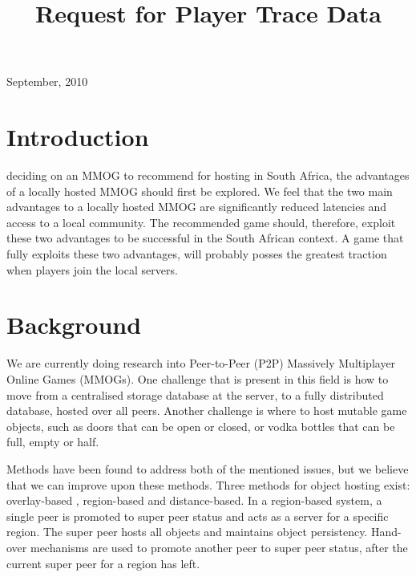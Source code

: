 \documentclass[journal,oneside,a4paper,onecolumn]{IEEEtran}
\begin{document}
%
\title{Request for Player Trace Data}

\author{
}

\maketitle

\hfill September, 2010

\section{Introduction}


 deciding on an \ac{MMOG} to recommend for hosting in South Africa, the advantages of a locally hosted \ac{MMOG} should first be
explored. We feel that the two main advantages to a locally hosted \ac{MMOG} are significantly reduced latencies and access to a local community. The
recommended game should, therefore, exploit these two advantages to be successful in the South African context. A game that fully exploits these two
advantages, will probably posses the greatest traction when players join the local servers.

\section{Background}

We are currently doing research into Peer-to-Peer (P2P) Massively Multiplayer Online Games (MMOGs). One challenge that is present in this field is
how to move from a centralised storage database at the server, to a fully distributed database, hosted over all peers. Another challenge is where to
host mutable game objects, such as doors that can be open or closed, or vodka bottles that can be full, empty or half.

Methods have been found to address both of the mentioned issues, but we believe that we can improve upon these methods. Three methods for object
hosting exist: overlay-based , region-based and distance-based. In a region-based system, a single peer is promoted to super peer status and acts as
a server for a specific region. The super peer hosts all objects and maintains object persistency. Hand-over mechanisms are used to promote another
peer to super peer status, after the current super peer for a region has left.
\end{document}
